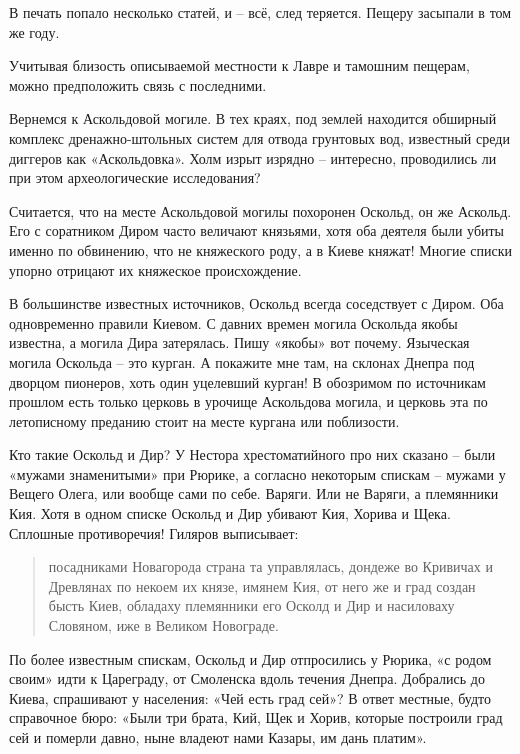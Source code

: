 В печать попало несколько статей, и – всё, след теряется. Пещеру засыпали в том же году.

Учитывая близость описываемой местности к Лавре и тамошним пещерам, можно предположить связь с последними.

Вернемся к Аскольдовой могиле. В тех краях, под землей находится обширный комплекс дренажно-штольных систем для отвода грунтовых вод, известный среди диггеров как «Аскольдовка». Холм изрыт изрядно – интересно, проводились ли при этом археологические исследования?
 


Считается, что на месте Аскольдовой могилы похоронен Оскольд, он же Аскольд. Его с соратником Диром часто величают князьями, хотя оба деятеля были убиты именно по обвинению, что не княжеского роду, а в Киеве княжат! Многие списки упорно отрицают их княжеское происхождение.

В большинстве известных источников, Оскольд всегда соседствует с Диром. Оба одновременно правили Киевом. С давних времен могила Оскольда якобы известна, а могила Дира затерялась. Пишу «якобы» вот почему. Языческая могила Оскольда – это курган. А покажите мне там, на склонах Днепра под дворцом пионеров, хоть один уцелевший курган! В обозримом по источникам прошлом есть только церковь в урочище Аскольдова могила, и церковь эта по летописному преданию стоит на месте кургана или поблизости.

Кто такие Оскольд и Дир? У Нестора хрестоматийного про них сказано – были «мужами знаменитыми» при Рюрике, а согласно некоторым спискам – мужами у Вещего Олега, или вообще сами по себе. Варяги. Или не Варяги, а племянники Кия. Хотя в одном списке Оскольд и Дир убивают Кия, Хорива и Щека. Сплошные противоречия! Гиляров выписывает\cite[стр. 114]{gilyarov01}:

\begin{quotation}
посадниками Новагорода страна та управлялась, дондеже во Кривичах и Древлянах по некоем их князе, имянем Кия, от него же и град создан бысть Киев, обладаху племянники его Осколд и Дир и насиловаху Словяном, иже в Великом Новограде.
\end{quotation}

По более известным спискам, Оскольд и Дир отпросились у Рюрика, «с родом своим» идти к Цареграду, от Смоленска вдоль течения Днепра. Добрались до Киева, спрашивают у населения: «Чей есть град сей»? В ответ местные, будто справочное бюро: «Были три брата, Кий, Щек и Хорив, которые построили град сей и померли давно, ныне владеют нами Казары, им дань платим».

